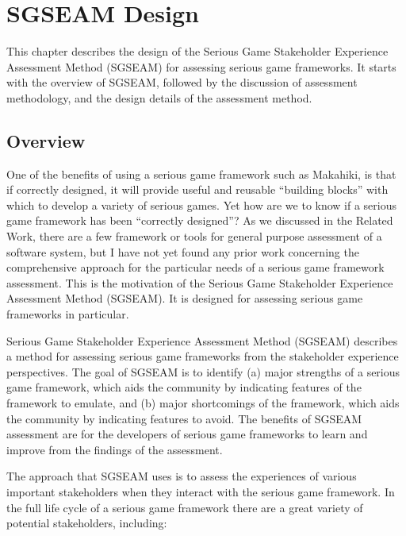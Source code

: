 \chapter{SGSEAM Design}
\label{cha:sgseam-design}

This chapter describes the design of the Serious Game Stakeholder Experience 
Assessment Method (SGSEAM) for assessing serious game frameworks. It starts with the overview of SGSEAM, followed by the discussion of assessment methodology, and the design details of the assessment method.

\section{Overview}

One of the benefits of using a serious game framework such as Makahiki, is that if correctly designed, it will provide useful and reusable ``building blocks'' with which to develop a variety of serious games. Yet how are we to know if a serious game framework has been ``correctly designed''? As we discussed in the Related Work, there are a few  framework or tools for general purpose assessment of a software system, but I have not yet found any prior work concerning the comprehensive approach for the particular needs of a serious game framework assessment. This is the motivation of the Serious Game Stakeholder Experience 
Assessment Method (SGSEAM). It is designed for assessing serious game frameworks in particular.

Serious Game Stakeholder Experience Assessment Method (SGSEAM) describes a method for 
assessing serious game frameworks from the stakeholder 
experience perspectives.  The goal of SGSEAM is to identify (a) major strengths of a serious game
framework, which aids the community by indicating features of the framework to emulate, and
(b) major shortcomings of the framework, which aids the community by indicating features to avoid.
The benefits of SGSEAM assessment are for the developers of serious game frameworks 
to learn and improve from the findings of the assessment.

The approach that SGSEAM uses is to assess the experiences of various important stakeholders when
they interact with the serious game framework. In the full life cycle of a serious game framework
there are a great variety of potential stakeholders, including:

